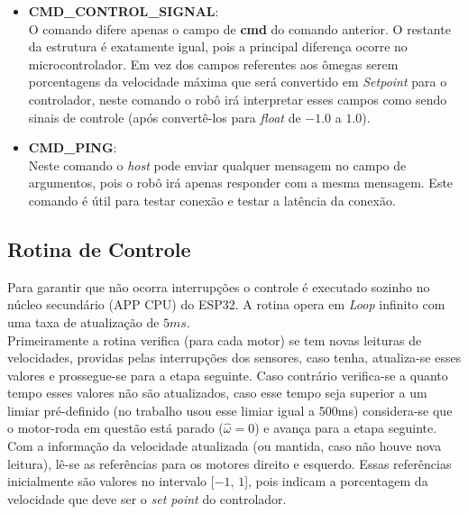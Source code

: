 \begin{itemize}
    \item \textbf{CMD\_CONTROL\_SIGNAL}:\\
        
        O comando difere apenas o campo de \textbf{cmd} do comando anterior. O restante da estrutura é exatamente igual, pois a principal diferença ocorre no microcontrolador. Em vez dos campos referentes aos ômegas serem porcentagens da velocidade máxima que será convertido em \textit{Setpoint} para o controlador, neste comando o robô irá interpretar esses campos como sendo sinais de controle (após convertê-los para \emph{float} de $-1.0$ a $1.0$).
        
    \item \textbf{CMD\_PING}:\\
        Neste comando o \textit{host} pode enviar qualquer mensagem no campo de argumentos, pois o robô irá apenas responder com a mesma mensagem. Este comando é útil para testar conexão e testar a latência da conexão.
    
\end{itemize}



\subsection{Rotina de Controle}
\label{subsec:rotina_controle}
Para garantir que não ocorra interrupções o controle é executado sozinho no núcleo secundário (APP CPU) do ESP32. A rotina opera em \emph{Loop} infinito com uma taxa de atualização de $5ms$.\\

Primeiramente a rotina verifica (para cada motor) se tem novas leituras de velocidades, providas pelas interrupções dos sensores, caso tenha, atualiza-se esses valores e prossegue-se para a etapa seguinte. Caso contrário verifica-se a quanto tempo esses valores não são atualizados, caso esse tempo seja superior a um limiar pré-definido (no trabalho usou esse limiar igual a 500ms) considera-se que o motor-roda em questão está parado ($\hat{\omega} = 0$) e avança para a etapa seguinte.\\

Com a informação da velocidade atualizada (ou mantida, caso não houve nova leitura), lê-se as referências para os motores direito e esquerdo. Essas referências inicialmente são valores no intervalo [$-1$, $1$], pois indicam a porcentagem da velocidade que deve ser o \emph{set point} do controlador. \\

